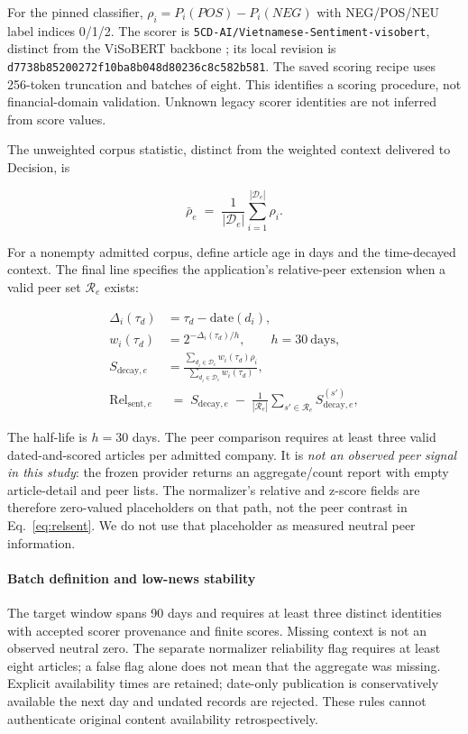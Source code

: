 For the pinned classifier, $\rho_i=P_i(POS)-P_i(NEG)$ with NEG/POS/NEU label indices 0/1/2. The scorer is \texttt{5CD-AI/Vietnamese-Sentiment-visobert}, distinct from the ViSoBERT backbone \cite{nguyen2023visobert,hf5cdsentiment}; its local revision is \texttt{d7738b85200272f10ba8b048d80236c8c582b581}. The saved scoring recipe uses 256-token truncation and batches of eight. This identifies a scoring procedure, not financial-domain validation. Unknown legacy scorer identities are not inferred from score values.

The unweighted corpus statistic, distinct from the weighted context delivered to Decision, is

\begin{equation}
    \bar{\rho}_e \;=\;
    \frac{1}{|\mathcal{D}_e|} \sum_{i=1}^{|\mathcal{D}_e|} \rho_i.
\end{equation}


For a nonempty admitted corpus, define article age in days and the time-decayed context. The final line specifies the application's relative-peer extension when a valid peer set $\mathcal{R}_e$ exists:

\begin{align}
    \Delta_i(\tau_d) &= \tau_d - \mathrm{date}(d_i), \\
    w_i(\tau_d) &= 2^{-\Delta_i(\tau_d)/h}, \qquad h=30\ \text{days}, \\
    S_{\mathrm{decay},e}
    &= \frac{\sum_{d_i\in\mathcal{D}_e} w_i(\tau_d)\rho_i}
             {\sum_{d_i\in\mathcal{D}_e} w_i(\tau_d)},
    \label{eq:sent_decay} \\[4pt]
    \mathrm{Rel}_{\mathrm{sent},e}
    &\;=\;
    S_{\mathrm{decay},e} \;-\;
    \frac{1}{|\mathcal{R}_e|}
    \sum_{s' \in \mathcal{R}_e} S^{(s')}_{\mathrm{decay},e},
    \label{eq:relsent}
\end{align}


The half-life is $h=30$ days. The peer comparison requires at least three valid dated-and-scored articles per admitted company. It is \emph{not an observed peer signal in this study}: the frozen provider returns an aggregate/count report with empty article-detail and peer lists. The normalizer's relative and z-score fields are therefore zero-valued placeholders on that path, not the peer contrast in Eq.~\ref{eq:relsent}. We do not use that placeholder as measured neutral peer information.

\paragraph{Batch definition and low-news stability}
The target window spans 90 days and requires at least three distinct identities with accepted scorer provenance and finite scores. Missing context is not an observed neutral zero. The separate normalizer reliability flag requires at least eight articles; a false flag alone does not mean that the aggregate was missing. Explicit availability times are retained; date-only publication is conservatively available the next day and undated records are rejected. These rules cannot authenticate original content availability retrospectively.

